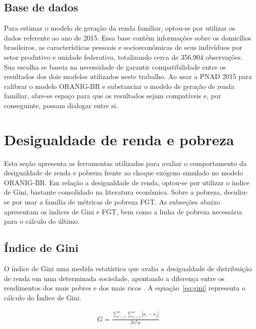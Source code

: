 \subsection{Base de dados} \label{subsec:dados_microssimulacao}

Para estimar o modelo de geração da renda familiar, optou-se por utilizar os dados  referente ao ano de 2015. Essa base contém informações	sobre os domicílios brasileiros, as características pessoais e socioeconômicas de seus indivíduos por setor produtivo e unidade federativa, totalizando cerca de 356.904 observações. Sua escolha se baseia na necessidade de garantir compatibilidade entre os resultados dos dois modelos utilizados neste trabalho. Ao usar a PNAD 2015 para calibrar o modelo ORANIG-BR e substanciar o modelo de geração de renda familiar, abre-se espaço para que os resultados sejam compatíveis e, por conseguinte, possam dialogar entre si.



\section{Desigualdade de renda e pobreza} \label{sec:desigualdade_pobreza}

Esta seção apresenta as ferramentas utilizadas para avaliar o comportamento da desigualdade de renda e pobreza frente ao choque exógeno simulado no modelo ORANIG-BR. Em relação a desigualdade de renda, optou-se por utilizar o índice de Gini, bastante consolidado na literatura econômica. Sobre a pobreza, decidiu-se por usar a família de métricas de pobreza FGT. As subseções abaixo apresentam os índices de Gini e FGT, bem como a linha de pobreza necessária para o cálculo do último.

\subsection{Índice de Gini}

O índice de Gini uma medida estatística que avalia a desigualdade de distribuição de renda em uma determinada sociedade, apontando a diferença entre os rendimentos dos mais pobres e dos mais ricos  \cite{hoffmann19}. A equação~\eqref{eq:gini} representa o cálculo do Índice de Gini.

\begin{align}
	G = \frac{\sum_{i=1}^{n}\sum_{j=1}^{n} | x_i - x_j |}{2n^{2}\mu} \label{eq:gini}
\end{align}

